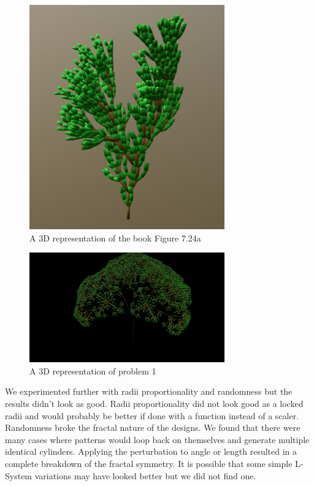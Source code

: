\begin{figure}[H]
    \centering
    \includegraphics[width=0.75\textwidth]{figures/L-systems/a3d.png}
    \caption[3D L-system Example]{A 3D representation of the book Figure 7.24a}\label{fig:a_3d}
\end{figure}

\begin{figure}[H]
    \centering
    \includegraphics[width=0.75\textwidth]{figures/L-systems/prob13d.jpg}
    \caption[3D Representation of Problem 1]{A 3D representation of problem 1}\label{fig:prob1_3d}
\end{figure}

We experimented further with radii proportionality and randomness but the
results didn't look as good. Radii proportionality did not look good as a
locked radii and would probably be better if done with a function instead of a
scaler. Randomness broke the fractal nature of the designs. We found that there
were many cases where patterns would loop back on themselves and generate
multiple identical cylinders. Applying the perturbation to angle or length
resulted in a complete breakdown of the fractal symmetry. It is possible that
some simple L-System variations may have looked better but we did not find one.


